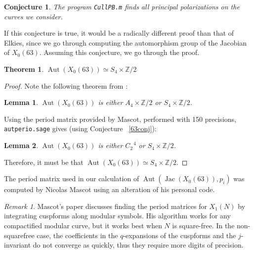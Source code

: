 \documentclass[12pt,reqno]{amsart}
\DeclareMathOperator{\Aut}{Aut}
\DeclareMathOperator{\Jac}{Jac}
\newcommand{\Z}{\mathbb{Z}}
\newtheorem*{thm*}{Theorem}
\newtheorem*{lemma*}{Lemma}
\newtheorem{conjecture}[theorem]{Conjecture}
\theoremstyle{definition}
\theoremstyle{remark}
\newtheorem*{remark}{Remark}
\begin{document}

\begin{conjecture} The program \texttt{CullPB.m} finds all principal polarizations on the curves we consider. \end{conjecture}

If this conjecture is true, it would be a radically different proof than that of Elkies, since we go through computing the automorphism group of the Jacobian of $X_0(63)$. Assuming this conjecture, we go through the proof.

\begin{thm*} $\Aut(X_0(63)) \simeq S_4 \times \Z/2$ \end{thm*} 

\begin{proof} Note the following theorem from \cite{km}: 

\begin{lemma*} $\Aut(X_0(63))$ is either $A_4 \times \Z/2$ or $S_4 \times \Z/2$. 
\end{lemma*}

Using the period matrix provided by Mascot, performed with 150 precisions, \texttt{autperio.sage} gives (using Conjecture ~\ref{63conj}):

\begin{lemma*} $\Aut(X_0(63))$ is either $C_2^{\text{ }4}$ or $S_4 \times \Z/2$.
\end{lemma*}

Therefore, it must be that $\Aut(X_0(63)) \simeq S_4 \times \Z/2$. 
\end{proof} 

\vspace{+10pt} 
The period matrix used in our calculation of $\Aut(\Jac(X_0(63)), p_i)$ was computed by Nicolas Mascot using an alteration of his personal code.

\begin{remark} Mascot's paper \cite{n} discusses finding the period matrices for $X_1(N)$ by integrating cuspforms along modular symbols. His algorithm works for any compactified modular curve, but it works best when $N$ is square-free. In the non-squarefree case, the coefficients in the $q$-expansions of the cuspforms and the $j$-invariant do not converge as quickly, thus they require more digits of precision. \end{remark}
\end{document}
